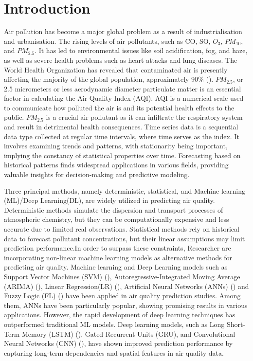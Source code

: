 \documentclass[a4paper, fleqn]{cas-sc}
\theoremstyle{definition}
\theoremstyle{remark}
\begin{document}
\section{Introduction}
Air pollution has become a major global problem as a result of industrialisation and urbanisation. The rising levels of air pollutants,  such as CO,  SO,  $O_3$,  $PM_{10}$,  and $PM_{2.5}$. It has led to environmental issues like soil acidification,  fog,  and haze,  as well as severe health problems such as heart attacks and lung diseases. The World Health Organization has revealed that contaminated air is presently affecting the majority of the global population,  approximately 90\% (\cite{zhou2019effects}). $PM_{2.5}$,  or 2.5 micrometers or less aerodynamic diameter particulate matter is an essential factor in calculating the Air Quality Index (AQI). AQI is a numerical scale used to communicate how polluted the air is and its potential health effects to the public. $PM_{2.5}$ is a crucial air pollutant as it can infiltrate the respiratory system and result in detrimental health consequences. Time series data is a sequential data type collected at regular time intervals,  where time serves as the index. It involves examining trends and patterns,  with stationarity being important,  implying the constancy of statistical properties over time. Forecasting based on historical patterns finds widespread applications in various fields,  providing valuable insights for decision-making and predictive modeling.

Three principal methods,  namely deterministic,  statistical,  and Machine learning (ML)/Deep Learning(DL),  are widely utilized in predicting air quality. Deterministic methods simulate the dispersion and transport processes of atmospheric chemistry,  but they can be computationally expensive and less accurate due to limited real observations. Statistical methods rely on historical data to forecast pollutant concentrations,  but their linear assumptions may limit prediction performance.In order to surpass these constraints,  Researcher are incorporating non-linear machine learning models as alternative methods for predicting air quality. Machine learning and Deep Learning models such as Support Vector Machines (SVM) (\cite{lin2011forecasting}), Autoregressive-Integrated Moving Average (ARIMA) (\cite{kumari2022machine}),  Linear Regression(LR) (\cite{kumari2022deep}),  Artificial Neural Networks (ANNs) (\cite{taylan2017modelling}) and Fuzzy Logic (FL) (\cite{wang2015model}) have been applied in air quality prediction studies. Among them,  ANNs have been particularly popular,  showing promising results in various applications. However,  the rapid development of deep learning techniques has outperformed traditional ML models. Deep learning models,  such as Long Short-Term Memory (LSTM) (\cite{kristiani2022short}),  Gated Recurrent Units (GRU),  and Convolutional Neural Networks (CNN) (\cite{ayturan2018air}),  have shown improved prediction performance by capturing long-term dependencies and spatial features in air quality data.
\end{document}
